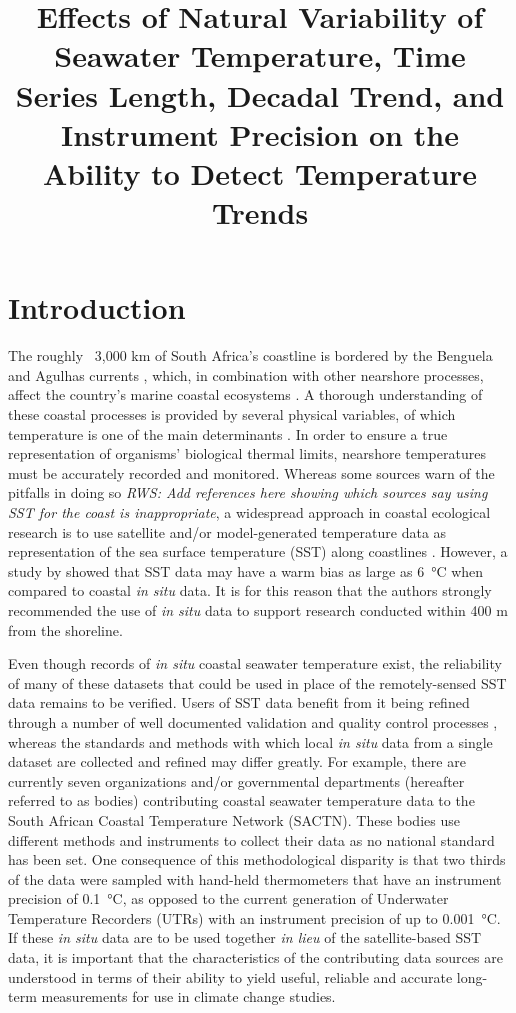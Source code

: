 \documentclass{ametsoc}
\title{Effects of Natural Variability of Seawater Temperature, Time Series Length, Decadal Trend, and Instrument Precision on the Ability to Detect Temperature Trends}
\affiliation{Department of Biodiversity and Conservation Biology, University of the Western Cape, Bellville, Republic of South Africa}
\begin{document}
\maketitle

\section{Introduction}
The roughly ~3,000 km of South Africa's coastline is bordered by the Benguela and Agulhas currents \citep[e.g.][]{Roberts2005,Hutchings2009}, which, in combination with other nearshore processes, affect the country's marine coastal ecosystems \citep{Santos2012a}. A thorough understanding of these coastal processes is provided by several physical variables, of which temperature is one of the main determinants \citep[e.g.][]{Blanchette2008, Tittensor2010, Couce2012}. In order to ensure a true representation of organisms' biological thermal limits, nearshore temperatures must be accurately recorded and monitored. Whereas some sources warn of the pitfalls in doing so \emph{RWS: Add references here showing which sources say using SST for the coast is inappropriate}, a widespread approach in coastal ecological research is to use satellite and/or model-generated temperature data as representation of the sea surface temperature (SST) along coastlines \citep[e.g.][]{Blanchette2008, Broitman2008a, Tyberghein2012}. However, a study by \citet{Smit2013} showed that SST data may have a warm bias as large as \SI{6}{\degreeCelsius} when compared to coastal \emph{in situ} data. It is for this reason that the authors strongly recommended the use of \emph{in situ} data to support research conducted within 400 m from the shoreline.

Even though records of \emph{in situ} coastal seawater temperature exist, the reliability of many of these datasets that could be used in place of the remotely-sensed SST data remains to be verified. Users of SST data benefit from it being refined through a number of well documented validation and quality control processes \citep[e.g.][]{Reynolds1994, Brown1999, Martin2012}, whereas the standards and methods with which local \emph{in situ} data from a single dataset are collected and refined may differ greatly. For example, there are currently seven organizations and/or governmental departments (hereafter referred to as bodies) contributing coastal seawater temperature data to the South African Coastal Temperature Network (SACTN). These bodies use different methods and instruments to collect their data as no national standard has been set. One consequence of this methodological disparity is that two thirds of the data were sampled with hand-held thermometers that have an instrument precision of \SI{0.1}{\degreeCelsius}, as opposed to the current generation of Underwater Temperature Recorders (UTRs) with an instrument precision of up to \SI{0.001}{\degreeCelsius}. If these \emph{in situ} data are to be used together \emph{in lieu} of the satellite-based SST data, it is important that the characteristics of the contributing data sources are understood in terms of their ability to yield useful, reliable and accurate long-term measurements for use in climate change studies.
\end{document}
